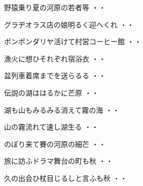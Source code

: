 \vspace{0.6cm}
\begin{shiika}野猿乗り夏の河原の若者等
\hfill{・・}\end{shiika}
\vspace{0.6cm}
\begin{shiika}グラヂオラス店の娘明るく迎へくれ
\hfill{・・}\end{shiika}
\vspace{0.6cm}
\begin{shiika}ポンポンダリヤ活けて村営コーヒー館
\hfill{・・}\end{shiika}
\vspace{0.6cm}
\begin{shiika}漁火に想ひそれぞれ宿浴衣
\hfill{・・}\end{shiika}
\vspace{0.6cm}
\begin{shiika}盆列車着席までを送らるる
\hfill{・・}\end{shiika}
\vspace{0.6cm}
\begin{shiika}伝説の湖ははるかに芒原
\hfill{・・}\end{shiika}
\vspace{0.6cm}
\begin{shiika}湖も山もみるみる消えて霧の海
\hfill{・・}\end{shiika}
\vspace{0.6cm}
\begin{shiika}山の霧流れて速し湖生る
\hfill{・・}\end{shiika}
\vspace{0.6cm}
\begin{shiika}のぼり来て賽の河原の細芒
\hfill{・・}\end{shiika}
\vspace{0.6cm}
\begin{shiika}旅に訪ふドラマ舞台の町も秋
\hfill{・・}\end{shiika}
\vspace{0.6cm}
\begin{shiika}久の出会ひ杖目じるしと言ふも秋
\hfill{・・}\end{shiika}
